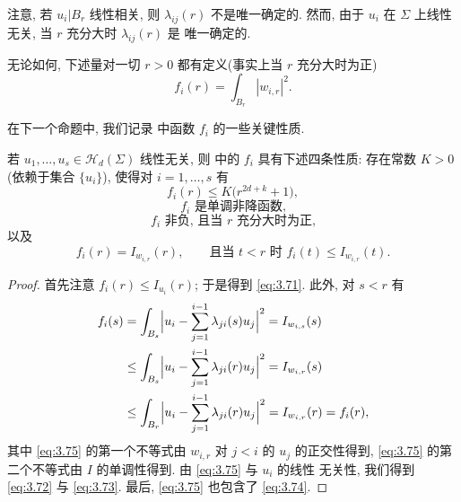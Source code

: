 注意, 若 $u_i|B_r$ 线性相关, 则 $\lambda_{ij}(r)$ 不是唯一确定的. 然而,
由于 $u_i$ 在 $\Sigma$ 上线性无关, 当 $r$ 充分大时 $\lambda_{ij}(r)$ 是
唯一确定的.

无论如何, 下述量对一切 $r>0$ 都有定义(事实上当 $r$ 充分大时为正)
\begin{equation}
f_i(r)=\int_{B_r}|w_{i,r}|^2.
\label{eq:3.70}
\end{equation}

在下一个命题中, 我们记录 中函数 $f_i$ 的一些关键性质.

\begin{proposition}
\label{prop:3.21}
若 $u_1,\dots,u_s\in\mathcal{H}_d(\Sigma)$ 线性无关, 则 中的
$f_i$ 具有下述四条性质: 存在常数 $K>0$(依赖于集合 $\{u_i\}$), 使得对
$i=1,\dots,s$ 有
\begin{equation}
f_i(r)\leq K\bigl(r^{2d+k}+1\bigr),
\label{eq:3.71}
\end{equation}
\begin{equation}
\text{$f_i$ 是单调非降函数,}
\label{eq:3.72}
\end{equation}
\begin{equation}
\text{$f_i$ 非负, 且当 $r$ 充分大时为正,}
\label{eq:3.73}
\end{equation}
以及
\begin{equation}
f_i(r)=I_{w_{i,r}}(r),\qquad
\text{且当 } t<r \text{ 时 } f_i(t)\leq I_{w_{i,r}}(t).
\label{eq:3.74}
\end{equation}
\end{proposition}

\begin{proof}
首先注意 $f_i(r)\leq I_{u_i}(r)$; 于是得到 \eqref{eq:3.71}. 此外, 对 $s<r$ 有
\begin{equation}
\begin{aligned}
f_i(s)&=\int_{B_s}\Bigl|u_i-\sum_{j=1}^{i-1}\lambda_{ji}(s)u_j\Bigr|^2
 =I_{w_{i,s}}(s)\\
&\leq\int_{B_s}\Bigl|u_i-\sum_{j=1}^{i-1}\lambda_{ji}(r)u_j\Bigr|^2
 =I_{w_{i,r}}(s)\\
&\leq\int_{B_r}\Bigl|u_i-\sum_{j=1}^{i-1}\lambda_{ji}(r)u_j\Bigr|^2
 =I_{w_{i,r}}(r)=f_i(r),
\end{aligned}
\label{eq:3.75}
\end{equation}
其中 \eqref{eq:3.75} 的第一个不等式由 $w_{i,r}$ 对 $j<i$ 的 $u_j$ 的正交性得到,
\eqref{eq:3.75} 的第二个不等式由 $I$ 的单调性得到. 由 \eqref{eq:3.75} 与 $u_i$ 的线性
无关性, 我们得到 \eqref{eq:3.72} 与 \eqref{eq:3.73}. 最后, \eqref{eq:3.75} 也包含了 \eqref{eq:3.74}.
\end{proof}


